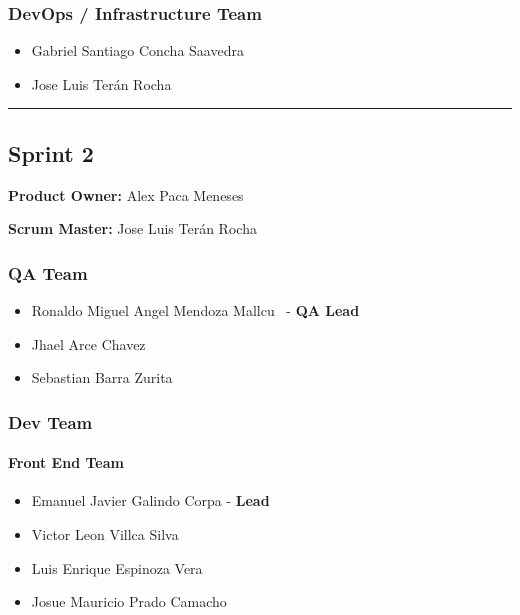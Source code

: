 \documentclass{article}
\providecommand{\tightlist}{
  \setlength{\itemsep}{0pt}\setlength{\parskip}{0pt}}
\begin{document}
\subsubsection{DevOps / Infrastructure Team}\label{devops-team-1}

\begin{itemize}
\tightlist
\item
  Gabriel Santiago Concha Saavedra
\item
  Jose Luis Terán Rocha
\end{itemize}

\begin{center}\rule{0.5\linewidth}{0.5pt}\end{center}

\hypertarget{sprint2}{
\subsection{\texorpdfstring{\textbf{Sprint
2}}{Sprint 2}}\label{sprint2}}

\textbf{Product Owner: }
Alex Paca Meneses

\textbf{Scrum Master: }
Jose Luis Terán Rocha

\hypertarget{qateam-2}{
\subsubsection{\texorpdfstring{\textbf{QA Team}}{QA Team}}\label{qateam-2}}

\begin{itemize}
\tightlist
\item
  Ronaldo Miguel Angel Mendoza Mallcu ~- \textbf{QA Lead}
\item
  Jhael Arce Chavez
\item
  Sebastian Barra Zurita
\end{itemize}

\hypertarget{devteam-2}{
\subsubsection{\texorpdfstring{\textbf{Dev
Team}}{Dev Team}}\label{devteam-2}}

\paragraph{Front End Team}\label{front-end-team-2}

\begin{itemize}
\tightlist
\item
  Emanuel Javier Galindo Corpa - \textbf{Lead}
\item
  Victor Leon Villca Silva
\item
  Luis Enrique Espinoza Vera
\item
  Josue Mauricio Prado Camacho
\end{itemize}
\end{document}
